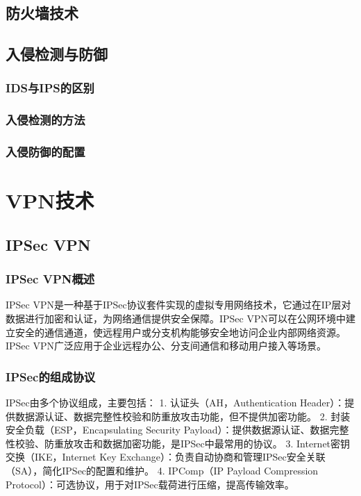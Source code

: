 \documentclass{book}
\begin{document}
\subsection{防火墙技术}
\subsection{入侵检测与防御}
\subsubsection{IDS与IPS的区别}
\subsubsection{入侵检测的方法}
\subsubsection{入侵防御的配置}

\section{VPN技术}

\subsection{IPSec VPN}

\subsubsection{IPSec VPN概述}

IPSec VPN是一种基于IPSec协议套件实现的虚拟专用网络技术，它通过在IP层对数据进行加密和认证，为网络通信提供安全保障。IPSec VPN可以在公网环境中建立安全的通信通道，使远程用户或分支机构能够安全地访问企业内部网络资源。IPSec VPN广泛应用于企业远程办公、分支间通信和移动用户接入等场景。

\subsubsection{IPSec的组成协议}
IPSec由多个协议组成，主要包括：
1. 认证头（AH，Authentication Header）：提供数据源认证、数据完整性校验和防重放攻击功能，但不提供加密功能。
2. 封装安全负载（ESP，Encapsulating Security Payload）：提供数据源认证、数据完整性校验、防重放攻击和数据加密功能，是IPSec中最常用的协议。
3. Internet密钥交换（IKE，Internet Key Exchange）：负责自动协商和管理IPSec安全关联（SA），简化IPSec的配置和维护。
4. IPComp（IP Payload Compression Protocol）：可选协议，用于对IPSec载荷进行压缩，提高传输效率。
\end{document}
